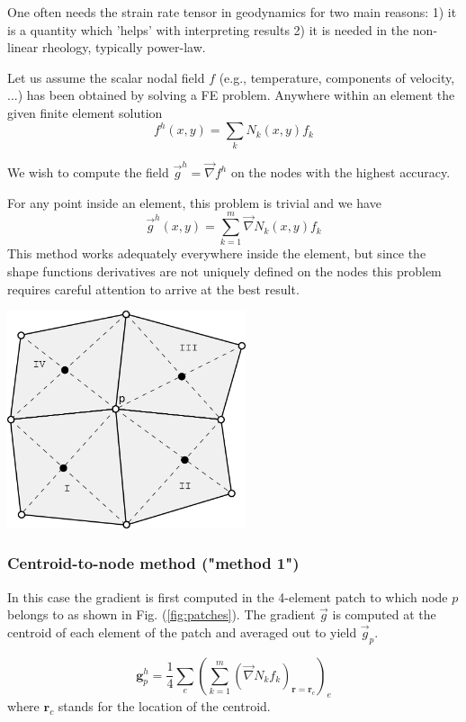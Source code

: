 
One often needs the strain rate tensor in geodynamics for two main reasons:
1) it is a quantity which 'helps' with interpreting results
2) it is needed in the non-linear rheology, typically power-law.

Let us assume the scalar nodal field $f$ (e.g., temperature, 
components of velocity, ...) has been obtained by solving a FE problem.
Anywhere within an element 
the given finite element solution 
\[
f^h(x,y)=\sum_k N_k(x,y) f_k
\]
 
We wish to compute the field $\vec g^h = \vec \nabla f^h$ on the nodes 
with the highest accuracy. 

For any point inside an element, this problem is trivial and we have 
\begin{equation}
\vec g^h(x,y) = \sum_{k=1}^m \vec\nabla N_k (x,y) f_k \label{eq:derr1}
\end{equation}
This method works adequately everywhere inside the element, but 
since the shape functions derivatives
are not uniquely defined on the nodes 
this problem requires careful attention
to arrive at the best result.

\begin{center}
\includegraphics[width=7cm]{images/patch/patch3}
\end{center}

\subsubsection{Centroid-to-node method ("method 1")}
In this case the gradient is first computed in the 4-element patch 
to which node $p$ belongs to as shown in Fig. (\ref{fig:patches}).
The gradient $\vec g$ is computed at the centroid of each element of the 
patch and averaged out to yield $\vec g_p$.

\[
\bm g_p^h = \frac{1}{4} \sum_{e} \left( \sum_{k=1}^m  (\vec\nabla N_k f_k)_{\bm r=\bm r_c} \right)_e
\]
where $\bm r_c$ stands for the location of the centroid. 

